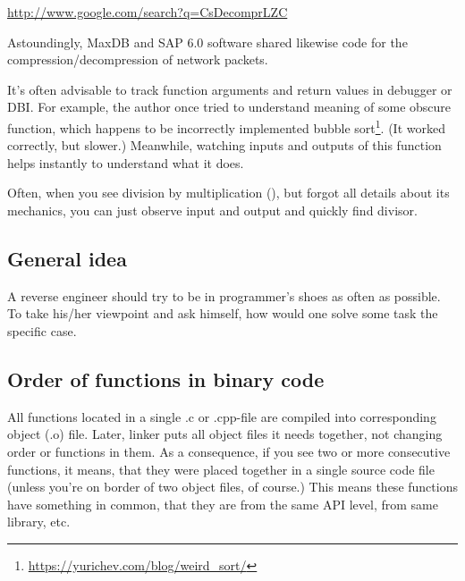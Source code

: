 \url{http://www.google.com/search?q=CsDecomprLZC}

Astoundingly, MaxDB and SAP 6.0 software shared likewise code for the compression/decompression of network packets.




It's often advisable to track function arguments and return values in debugger or \ac{DBI}.
For example, the author once tried to understand meaning of some obscure function, which happens to be incorrectly
implemented bubble sort\footnote{\url{https://yurichev.com/blog/weird_sort/}}.
(It worked correctly, but slower.)
Meanwhile, watching inputs and outputs of this function helps instantly to understand what it does.

Often, when you see division by multiplication (),
but forgot all details about its mechanics, you can just observe input
and output and quickly find divisor.














\subsection{General idea}

A reverse engineer should try to be in programmer's shoes as often as possible. 
To take his/her viewpoint and ask himself, how would one solve some task the specific case.

\subsection{Order of functions in binary code}

All functions located in a single .c or .cpp-file are compiled into corresponding object (.o) file.
Later, linker puts all object files it needs together, not changing order or functions in them.
As a consequence, if you see two or more consecutive functions, it means, that they were placed together
in a single source code file (unless you're on border of two object files, of course.)
This means these functions have something in common, that they are from the same \ac{API} level, from same library, etc.


